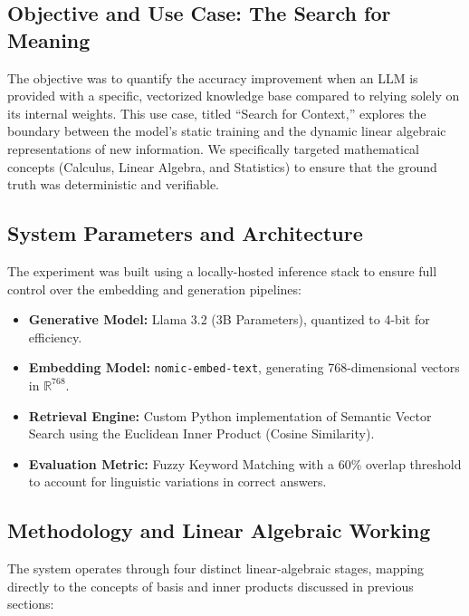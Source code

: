 \documentclass[12pt,a4paper]{article}
\begin{document}
\subsection{Objective and Use Case: The Search for Meaning}
The objective was to quantify the accuracy improvement when an LLM is provided with a specific, vectorized knowledge base compared to relying solely on its internal weights. This use case, titled ``Search for Context,'' explores the boundary between the model's static training and the dynamic linear algebraic representations of new information. We specifically targeted mathematical concepts (Calculus, Linear Algebra, and Statistics) to ensure that the ground truth was deterministic and verifiable.

\subsection{System Parameters and Architecture}
The experiment was built using a locally-hosted inference stack to ensure full control over the embedding and generation pipelines:
\begin{itemize}[itemsep=2pt]
    \item \textbf{Generative Model:} Llama 3.2 (3B Parameters), quantized to 4-bit for efficiency.
    \item \textbf{Embedding Model:} \texttt{nomic-embed-text}, generating 768-dimensional vectors in $\mathbb{R}^{768}$.
    \item \textbf{Retrieval Engine:} Custom Python implementation of Semantic Vector Search using the Euclidean Inner Product (Cosine Similarity).
    \item \textbf{Evaluation Metric:} Fuzzy Keyword Matching with a 60\% overlap threshold to account for linguistic variations in correct answers.
\end{itemize}

\subsection{Methodology and Linear Algebraic Working}
The system operates through four distinct linear-algebraic stages, mapping directly to the concepts of basis and inner products discussed in previous sections:
\end{document}
